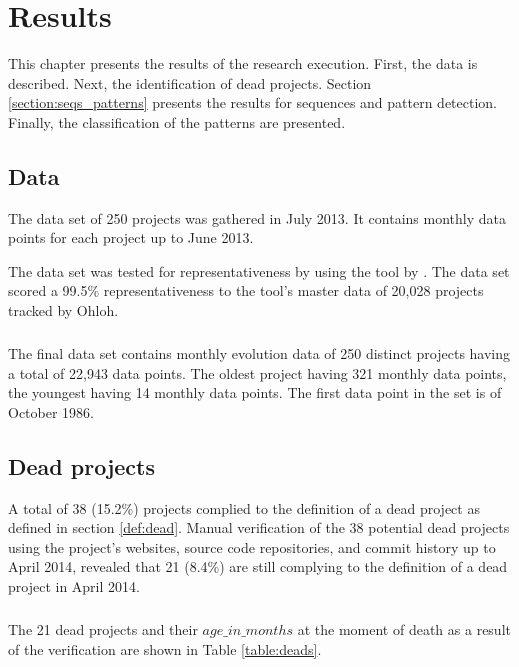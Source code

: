 \chapter{Results}
\label{results}

This chapter presents the results of the research execution. First, the data is
described. Next, the identification of dead projects. Section
\ref{section:seqs_patterns} presents the results for sequences and pattern
detection. Finally, the classification of the patterns are presented.

\section{Data}
The data set of 250 projects was gathered in July 2013. It contains monthly
data points for each project up to June 2013.

The data set was tested for representativeness by using the tool by
\citet{nagappan}. The data set scored a 99.5\% representativeness to the tool's
master data of 20,028 projects tracked by Ohloh.

\paragraph{}
The final data set contains monthly evolution data of 250 distinct projects
having a total of 22,943 data points. The oldest project having 321 monthly
data points, the youngest having 14 monthly data points. The first data point
in the set is of October 1986.

\section{Dead projects}
\label{section:deads}
A total of 38 (15.2\%) projects complied to the definition of a dead project as
defined in section \ref{def:dead}. Manual verification of the 38 potential
dead projects using the project's websites, source code repositories, and
commit history up to April 2014, revealed that 21 (8.4\%) are still complying
to the definition of a dead project in April 2014.

\paragraph{}
The 21 dead projects and their $age\_in\_months$ at the moment of death as a
result of the verification are shown in Table \ref{table:deads}.



